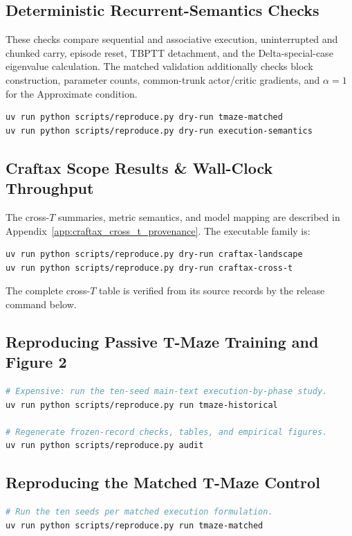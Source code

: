 \subsection{Deterministic Recurrent-Semantics Checks}
These checks compare sequential and associative execution, uninterrupted and chunked carry, episode reset, TBPTT detachment, and the Delta-special-case eigenvalue calculation. The matched validation additionally checks block construction, parameter counts, common-trunk actor/critic gradients, and $\alpha=1$ for the Approximate condition.
\begin{lstlisting}[language=bash]
uv run python scripts/reproduce.py dry-run tmaze-matched
uv run python scripts/reproduce.py dry-run execution-semantics
\end{lstlisting}

\subsection{Craftax Scope Results \& Wall-Clock Throughput}
The cross-$T$ summaries, metric semantics, and model mapping are described in Appendix~\ref{app:craftax_cross_t_provenance}. The executable family is:
\begin{lstlisting}[language=bash]
uv run python scripts/reproduce.py dry-run craftax-landscape
uv run python scripts/reproduce.py dry-run craftax-cross-t
\end{lstlisting}
The complete cross-$T$ table is verified from its source records by the release command below.

\subsection{Reproducing Passive T-Maze Training and Figure 2}
\begin{lstlisting}[language=bash]
# Expensive: run the ten-seed main-text execution-by-phase study.
uv run python scripts/reproduce.py run tmaze-historical

# Regenerate frozen-record checks, tables, and empirical figures.
uv run python scripts/reproduce.py audit
\end{lstlisting}

\subsection{Reproducing the Matched T-Maze Control}
\begin{lstlisting}[language=bash]
# Run the ten seeds per matched execution formulation.
uv run python scripts/reproduce.py run tmaze-matched
\end{lstlisting}

